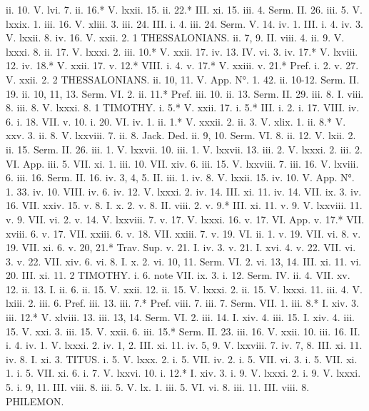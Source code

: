 ii. 10.	V. lvi. 7.
ii. 16.*	V. lxxii. 15.
ii. 22.*	III. xi. 15.
iii. 4.	Serm. II. 26.
iii. 5.	V. lxxix. 1.
iii. 16.	V. xliii. 3.
iii. 24.	III. i. 4.
iii. 24.	Serm. V. 14.
iv. 1.	III. i. 4.
iv. 3.	V. lxxii. 8.
iv. 16.	V. xxii. 2.
1 THESSALONIANS.
ii. 7, 9.	II. viii. 4.
ii. 9.	V. lxxxi. 8.
ii. 17.	V. lxxxi. 2.
iii. 10.*	V. xxii. 17.
iv. 13.	IV. vi. 3.
iv. 17.*	V. lxviii. 12.
iv. 18.*	V. xxii. 17.
v. 12.*	VIII. i. 4.
v. 17.*	V. xxiii.
v. 21.*	Pref. i. 2.
v. 27.	V. xxii. 2.
2 THESSALONIANS.
ii. 10, 11.	V. App. N°. 1. 42.
ii. 10-12.	Serm. II. 19.
ii. 10, 11, 13.	Serm. VI. 2.
ii. 11.*	Pref. iii. 10.
ii. 13.	Serm. II. 29.
iii. 8.	I. viii. 8.
iii. 8.	V. lxxxi. 8.
1 TIMOTHY.
i. 5.*	V. xxii. 17.
i. 5.*	III. i. 2.
i. 17.	VIII. iv. 6.
i. 18.	VII. v. 10.
i. 20.	VI. iv. 1.
ii. 1.*	V. xxxii. 2.
ii. 3.	V. xlix. 1.
ii. 8.*	V. xxv. 3.
ii. 8.	V. lxxviii. 7.
ii. 8.	Jack. Ded.
ii. 9, 10.	Serm. VI. 8.
ii. 12.	V. lxii. 2.
ii. 15.	Serm. II. 26.
iii. 1.	V. lxxvii. 10.
iii. 1.	V. lxxvii. 13.
iii. 2.	V. lxxxi. 2.
iii. 2.	VI. App.
iii. 5.	VII. xi. 1.
iii. 10.	VII. xiv. 6.
iii. 15.	V. lxxviii. 7.
iii. 16.	V. lxviii. 6.
iii. 16.	Serm. II. 16.
iv. 3, 4, 5.	II. iii. 1.
iv. 8.	V. lxxii. 15.
iv. 10.	V. App. N°. 1. 33.
iv. 10.	VIII. iv. 6.
iv. 12.	V. lxxxi. 2.
iv. 14.	III. xi. 11.
iv. 14.	VII. ix. 3.
iv. 16.	VII. xxiv. 15.
v. 8.	I. x. 2.
v. 8.	II. viii. 2.
v. 9.*	III. xi. 11.
v. 9.	V. lxxviii. 11.
v. 9.	VII. vi. 2.
v. 14.	V. lxxviii. 7.
v. 17.	V. lxxxi. 16.
v. 17.	VI. App.
v. 17.*	VII. xviii. 6.
v. 17.	VII. xxiii. 6.
v. 18.	VII. xxiii. 7.
v. 19.	VI. ii. 1.
v. 19.	VII. vi. 8.
v. 19.	VII. xi. 6.
v. 20, 21.*	Trav. Sup.
v. 21.	I. iv. 3.
v. 21.	I. xvi. 4.
v. 22.	VII. vi. 3.
v. 22.	VII. xiv. 6.
vi. 8.	I. x. 2.
vi. 10, 11.	Serm. VI. 2.
vi. 13, 14.	III. xi. 11.
vi. 20.	III. xi. 11.
2 TIMOTHY.
i. 6. note	VII. ix. 3.
i. 12.	Serm. IV.
ii. 4.	VII. xv. 12.
ii. 13.	I. ii. 6.
ii. 15.	V. xxii. 12.
ii. 15.	V. lxxxi. 2.
ii. 15.	V. lxxxi. 11.
iii. 4.	V. lxiii. 2.
iii. 6.	Pref. iii. 13.
iii. 7.*	Pref. viii. 7.
iii. 7.	Serm. VII. 1.
iii. 8.*	I. xiv. 3.
iii. 12.*	V. xlviii. 13.
iii. 13, 14.	Serm. VI. 2.
iii. 14.	I. xiv. 4.
iii. 15.	I. xiv. 4.
iii. 15.	V. xxi. 3.
iii. 15.	V. xxii. 6.
iii. 15.*	Serm. II. 23.
iii. 16.	V. xxii. 10.
iii. 16.	II. i. 4.
iv. 1.	V. lxxxi. 2.
iv. 1, 2.	III. xi. 11.
iv. 5, 9.	V. lxxviii. 7.
iv. 7, 8.	III. xi. 11.
iv. 8.	I. xi. 3.
TITUS.
i. 5.	V. lxxx. 2.
i. 5.	VII. iv. 2.
i. 5.	VII. vi. 3.
i. 5.	VII. xi. 1.
i. 5.	VII. xi. 6.
i. 7.	V. lxxvi. 10.
i. 12.*	I. xiv. 3.
i. 9.	V. lxxxi. 2.
i. 9.	V. lxxxi. 5.
i. 9, 11.	III. viii. 8.
iii. 5.	V. lx. 1.
iii. 5.	VI. vi. 8.
iii. 11.	III. viii. 8.
PHILEMON.
